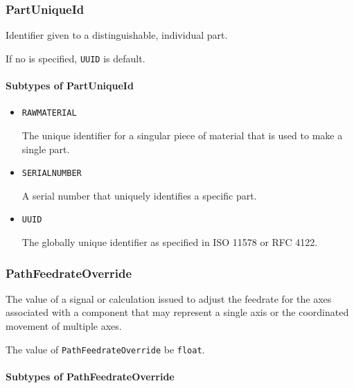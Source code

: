 \subsubsection{PartUniqueId}
\label{sec:PartUniqueId}



Identifier given to a distinguishable, individual part. 

If no  is specified, \texttt{UUID} is default.



\paragraph{Subtypes of PartUniqueId}\mbox{}
\label{sec:Subtypes of PartUniqueId}

\begin{itemize}

\item \texttt{RAW\textunderscore MATERIAL}


The unique identifier for a singular piece of material that is used to make a single part.

\item \texttt{SERIAL\textunderscore NUMBER}


A serial number that uniquely identifies a specific part.

\item \texttt{UUID}


The globally unique identifier as specified in ISO 11578 or RFC 4122.


\end{itemize}






\subsubsection{PathFeedrateOverride}
\label{sec:PathFeedrateOverride}



The value of a signal or calculation issued to adjust the feedrate for the axes associated with a  component that may represent a single axis or the coordinated movement of multiple axes.


The value of \texttt{PathFeedrateOverride} \MUST be \texttt{float}.


\paragraph{Subtypes of PathFeedrateOverride}\mbox{}
\label{sec:Subtypes of PathFeedrateOverride}

